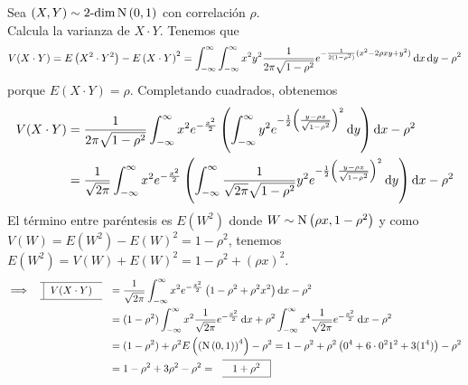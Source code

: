 
\begin{ejer}
	Sea $(X, Y) \sim \operatorname{2-dim}\operatorname{N}\left(0,1\right)$ con correlación $\rho$. \\
	Calcula la varianza de $X\cdot Y$. Tenemos que
	\[V(X\cdot Y) = E\left(X^2\cdot Y^2\right) - E\left(X\cdot Y\right)^2 = \int_{-\infty}^{\infty} \int_{-\infty}^{\infty} x^2y^2\frac{1}{2\pi\sqrt{1-\rho^2}}e^{-\frac{1}{2(1-\rho^2)}(x^2-2\rho xy + y^2)}\odif{x} \odif{y} - \rho^2\]
	porque $E(X\cdot Y) = \rho$.
	Completando cuadrados, obtenemos
	\[\begin{aligned} %
			V(X\cdot Y) & = \frac{1}{2\pi\sqrt{1-\rho^2}}\int_{-\infty}^{\infty} x^2 e^{-\frac{x^2}{2}} \left(\int_{-\infty}^{\infty} y^2 e^{-\frac{1}{2}\left(\frac{y-\rho x}{\sqrt{1-\rho^2}}\right)^2}\odif{y}\right)\odif{x} -                     \rho^2           \\
			            & = \frac{1}{\sqrt{2\pi}} \int_{-\infty}^{\infty} x^2 e^{-\frac{x^2}{2}} \left(\int_{-\infty}^{\infty} \frac{1}{\sqrt{2\pi}\sqrt{1-\rho^2}}y^2 e^{-\frac{1}{2}\left(\frac{y-\rho x}{\sqrt{1-\rho^2}}\right)^2}\odif{y}\right) \odif{x} - \rho^2
		\end{aligned}\]
	El término entre paréntesis es $E\left(W^2\right)$ donde $W\sim\operatorname{N}\left(\rho x, 1-\rho^2\right)$ y como \\$V(W) = E(W^2) - E(W)^2 = 1-\rho^2$, tenemos $E(W^2) = V(W) + E(W)^2 = 1-\rho^2 + (\rho x)^2$.
	\[\begin{aligned}
			\implies \lbox{V(X\cdot Y)} & = \frac{1}{\sqrt{2\pi}} \int_{-\infty}^{\infty} x^2 e^{-\frac{x^2}{2}} \left(1-\rho^2 + \rho^2 x^2\right)\odif{x} - \rho^2                                                             \\
			                            & = (1-\rho^2) \int_{-\infty}^{\infty} x^2 \frac{1}{\sqrt{2\pi}}e^{-\frac{x^2}{2}}\odif{x} + \rho^2 \int_{-\infty}^{\infty} x^4 \frac{1}{\sqrt{2\pi}}e^{-\frac{x^2}{2}}\odif{x} - \rho^2 \\
			                            & = (1-\rho^2) + \rho^2 E\left(\left(\normal{0, 1}\right)^4\right) - \rho^2 = 1-\rho^2 + \rho^2\left(0^4 +6\cdot 0^2 1^2 + 3(1^4)\right) - \rho^2                                        \\
			                            & = 1 - \rho^2 + 3\rho^2 - \rho^2 = \rbox{1 + \rho^2}
		\end{aligned}\]
\end{ejer}

